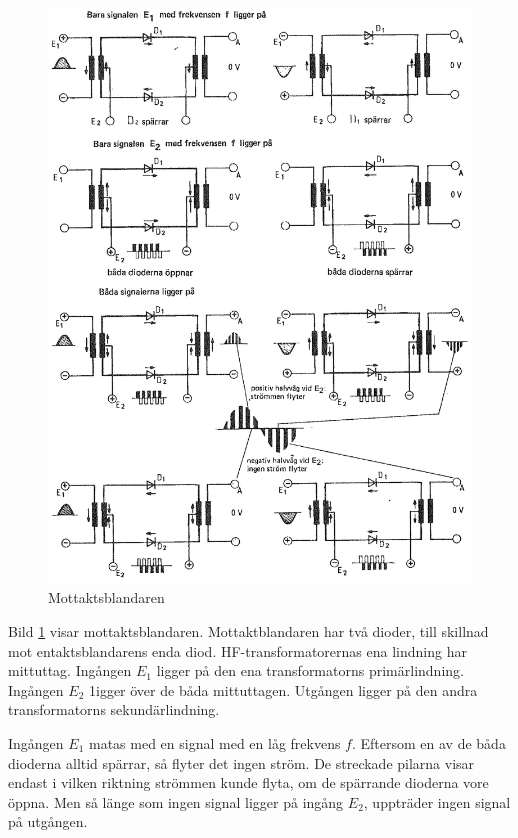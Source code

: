 \begin{figure}
\includegraphics[width=\textwidth]{images/cropped_pdfs/bild_2_3-85.pdf}
\caption{Mottaktsblandaren}
\label{fig:BildII3-85}
\end{figure}

Bild \ref{fig:BildII3-85} visar mottaktsblandaren.
Mottaktblandaren har två dioder, till skillnad mot entaktsblandarens enda diod.
HF-transformatorernas ena lindning har mittuttag.
Ingången \(E_1\) ligger på den ena transformatorns primärlindning.
Ingången \(E_2\) 1igger över de båda mittuttagen.
Utgången ligger på den andra transformatorns sekundärlindning.

Ingången \(E_1\) matas med en signal med en låg frekvens \(f\).
Eftersom en av de båda dioderna alltid spärrar, så flyter det ingen ström.
De streckade pilarna visar endast i vilken riktning strömmen kunde flyta, om de
spärrande dioderna vore öppna.
Men så länge som ingen signal ligger på ingång \(E_2\), uppträder ingen
signal på utgången.

